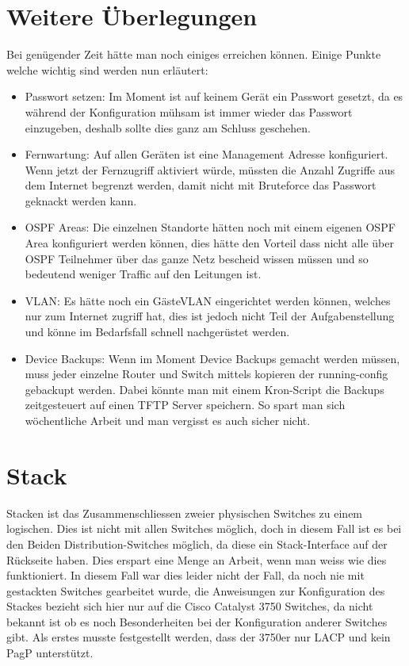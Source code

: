 \documentclass[11pt,a4paper]{scrreprt}
\begin{document}
\section{Weitere Überlegungen}

Bei genügender Zeit hätte man noch einiges erreichen können. Einige Punkte welche wichtig sind werden nun erläutert:
\begin{itemize}
\item Passwort setzen: Im Moment ist auf keinem Gerät ein Passwort gesetzt, da es während der Konfiguration mühsam ist immer wieder das Passwort einzugeben, deshalb sollte dies ganz am Schluss geschehen.
\item Fernwartung: Auf allen Geräten ist eine Management Adresse konfiguriert. Wenn jetzt der Fernzugriff aktiviert würde, müssten die Anzahl Zugriffe aus dem Internet begrenzt werden, damit nicht mit Bruteforce das Passwort geknackt werden kann.
\item OSPF Areas: Die einzelnen Standorte hätten noch mit einem eigenen OSPF Area konfiguriert werden können, dies hätte den Vorteil dass nicht alle über OSPF Teilnehmer über das ganze Netz bescheid wissen müssen und so bedeutend weniger Traffic auf den Leitungen ist.
\item \acs{VLAN}: Es hätte noch ein Gäste\acs{VLAN} eingerichtet werden können, welches nur zum Internet zugriff hat, dies ist jedoch nicht Teil der Aufgabenstellung und könne im Bedarfsfall schnell nachgerüstet werden.
\item Device Backups: Wenn im Moment Device Backups gemacht werden müssen, muss jeder einzelne Router und Switch mittels kopieren der running-config gebackupt werden. Dabei könnte man mit einem Kron-Script die Backups zeitgesteuert auf einen TFTP Server speichern. So spart man sich wöchentliche Arbeit und man vergisst es auch sicher nicht.
\end{itemize}

\section{Stack}
Stacken ist das Zusammenschliessen zweier physischen Switches zu einem logischen. Dies ist nicht mit allen Switches möglich, doch in diesem Fall ist es bei den Beiden Distribution-Switches möglich, da diese ein Stack-Interface auf der Rückseite haben. Dies erspart eine Menge an Arbeit, wenn man weiss wie dies funktioniert. In diesem Fall war dies leider nicht der Fall, da noch nie mit gestackten Switches gearbeitet wurde, die Anweisungen zur Konfiguration des Stackes bezieht sich hier nur auf die Cisco Catalyst 3750 Switches, da nicht bekannt ist ob es noch Besonderheiten bei der Konfiguration anderer Switches gibt. Als erstes musste festgestellt werden, dass der 3750er nur \acs{LACP} und kein \acs{PagP} unterstützt.
\end{document}
